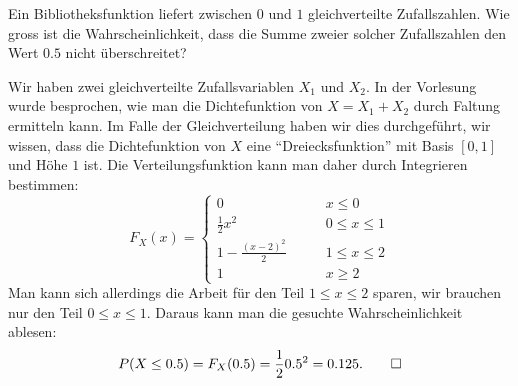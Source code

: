 Ein Bibliotheksfunktion liefert zwischen $0$ und $1$ gleichverteilte
Zufallszahlen. Wie gross ist die Wahrscheinlichkeit, dass die Summe
zweier solcher Zufallszahlen den Wert $0.5$ nicht überschreitet?

\begin{loesung}
Wir haben zwei gleichverteilte Zufallsvariablen $X_1$ und $X_2$. 
In der Vorlesung wurde besprochen, wie man die Dichtefunktion
von $X=X_1+X_2$ durch Faltung ermitteln kann.
Im Falle der Gleichverteilung haben wir dies durchgeführt,
wir wissen, dass die Dichtefunktion von $X$
eine ``Dreiecksfunktion'' mit Basis $[0,1]$ und Höhe $1$ ist.
Die Verteilungsfunktion kann man daher durch Integrieren bestimmen:
\[
F_X(x)=\begin{cases}
0&\qquad x\le 0\\
\frac12x^2&\qquad 0\le x\le 1\\
1-\frac{(x-2)^2}2&\qquad1\le x\le 2\\
1&\qquad x\ge 2
\end{cases}
\]
Man kann sich allerdings die Arbeit für den Teil $1\le x\le 2$ sparen,
wir brauchen nur den Teil $0\le x\le 1$.
Daraus kann man die gesuchte Wahrscheinlichkeit ablesen:
\[
P(X\le 0.5)=F_X(0.5)=\frac120.5^2=0.125.
\qedhere
\]
\end{loesung}

